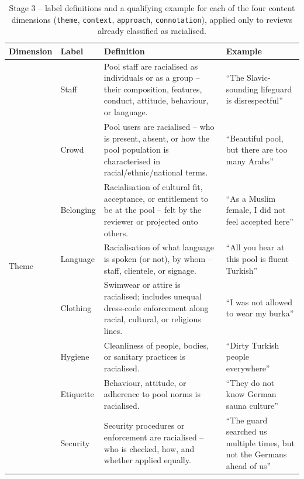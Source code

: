 \begin{table}[htbp]
\centering
\small
\caption{Stage 3 -- label definitions and a qualifying example for each of the four content dimensions (\texttt{theme}, \texttt{context}, \texttt{approach}, \texttt{connotation}), applied only to reviews already classified as racialised.}
\label{tab:codebook-dimensions}
\begin{tabular}{@{} l l p{} p{} @{}}
\toprule
Dimension & Label & Definition & Example \\
\midrule
\multirow[t]{11}{*}{Theme} & Staff & Pool staff are racialised as individuals or as a group -- their composition, features, conduct, attitude, behaviour, or language. & ``The Slavic-sounding lifeguard is disrespectful'' \\
 & Crowd & Pool users are racialised -- who is present, absent, or how the pool population is characterised in racial/ethnic/national terms. & ``Beautiful pool, but there are too many Arabs'' \\
 & Belonging & Racialisation of cultural fit, acceptance, or entitlement to be at the pool -- felt by the reviewer or projected onto others. & ``As a Muslim female, I did not feel accepted here'' \\
 & Language & Racialisation of what language is spoken (or not), by whom -- staff, clientele, or signage. & ``All you hear at this pool is fluent Turkish'' \\
 & Clothing & Swimwear or attire is racialised; includes unequal dress-code enforcement along racial, cultural, or religious lines. & ``I was not allowed to wear my burka'' \\
 & Hygiene & Cleanliness of people, bodies, or sanitary practices is racialised. & ``Dirty Turkish people everywhere'' \\
 & Etiquette & Behaviour, attitude, or adherence to pool norms is racialised. & ``They do not know German sauna culture'' \\
 & Security & Security procedures or enforcement are racialised -- who is checked, how, and whether applied equally. & ``The guard searched us multiple times, but not the Germans ahead of us'' \\

\end{tabular}
\end{table}

